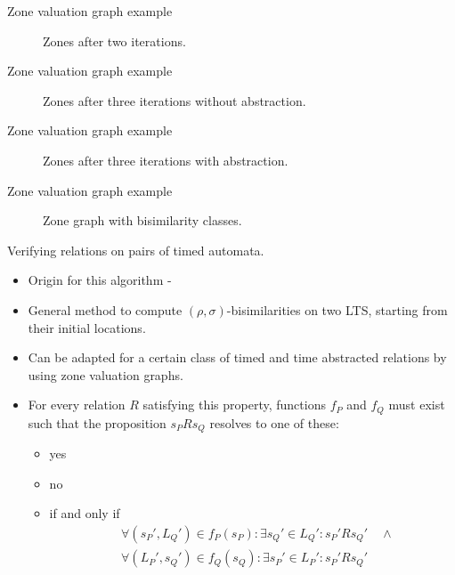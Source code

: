 \documentclass{beamer}
\begin{document}
\begin{frame}[shrink=20]{Zone valuation graph example}
  \begin{figure}
    \centering
    \def\svgwidth{0.7\columnwidth}
    
    \caption{Zones after two iterations.}
  \end{figure}
\end{frame}

\begin{frame}[shrink=20]{Zone valuation graph example}
  \begin{figure}
    \centering
    \def\svgwidth{0.9\columnwidth}
    
    \caption{Zones after three iterations without abstraction.}
  \end{figure}
\end{frame}

\begin{frame}[shrink=20]{Zone valuation graph example}
  \begin{figure}
    \centering
    \def\svgwidth{1.2\columnwidth}
    
    \caption{Zones after three iterations with abstraction.}
  \end{figure}
\end{frame}

\begin{frame}[shrink=60]{Zone valuation graph example}
  \begin{figure}
    \centering
    \def\svgwidth{2.7\columnwidth}
    
    \caption{Zone graph with bisimilarity classes.}
  \end{figure}
\end{frame}

\begin{frame}{Verifying relations on pairs of timed automata.}
  \begin{itemize}
  \item Origin for this algorithm - \cite{arun2006bisimilarities} 
  \item General method to compute $(\rho, \sigma)$-bisimilarities on
    two LTS, starting from their initial locations.
  \item Can be adapted for a certain class of timed and time
    abstracted relations by using zone valuation graphs.
  \item For every relation $R$ satisfying this property, functions
    $f_P$ and $f_Q$ must exist such that the proposition $s_P R s_Q$
    resolves to one of these:
    \begin{itemize}
    \item yes
    \item no
    \item if and only if 
      \begin{align*} 
        &\forall (s_P', L_Q') \in f_P(s_P): \exists s_Q' \in
        L_Q': s_P' R s_Q' \quad \wedge \\
        &\forall (L_P', s_Q') \in f_Q(s_Q): \exists s_P' \in
        L_P': s_P' R s_Q'
      \end{align*} 
    \end{itemize}
  \end{itemize}
\end{frame}
\end{document}
